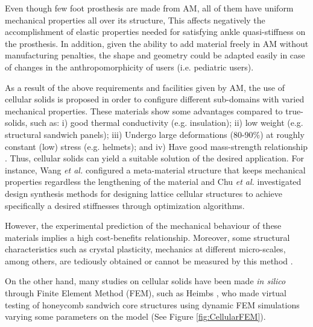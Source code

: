 \documentclass[12pt,english]{article}
\begin{document}
Even though few foot prosthesis are made from AM, all of them have uniform mechanical properties all over its structure, This affects negatively the accomplishment of elastic properties needed for satisfying ankle quasi-stiffness on the prosthesis. In addition, given the ability to add material freely in AM without manufacturing penalties, the shape and geometry could be adapted easily in case of changes in the anthropomorphicity of users (i.e. pediatric users).

As a result of the above requirements and facilities given by AM, the use of cellular solids is proposed in order to configure different sub-domains with varied mechanical properties. These materials show some advantages compared to true-solids, such as: i) good thermal conductivity (e.g. insulation); ii) low weight (e.g. structural sandwich panels); iii) Undergo large deformations (80-90\%) at roughly constant (low) stress (e.g. helmets); and iv) Have good mass-strength relationship \cite{Gibson1997}. Thus, cellular solids can yield a suitable solution of the desired application. For instance, Wang \emph{et al.} \cite{Wang2016} configured a meta-material structure that keeps mechanical properties regardless the lengthening of the material and Chu \emph{et al.} \cite{Chu2010} investigated design synthesis methods for designing lattice cellular structures to achieve specifically a desired stiffnesses through optimization algorithms. 

However, the experimental prediction of the mechanical behaviour of these materials implies a high cost-benefits relationship. Moreover, some structural characteristics such as crystal plasticity, mechanics at different micro-scales, among others, are tediously obtained or cannot be measured by this method \cite{Okereke2014}.

On the other hand, many studies on cellular solids have been made \emph{in silico} through Finite Element Method (FEM), such as Heimbs \cite{Heimbs2009}, who made virtual testing of honeycomb sandwich core structures using dynamic FEM simulations varying some parameters on the model (See Figure \ref{fig:CellularFEM}). 
\end{document}
